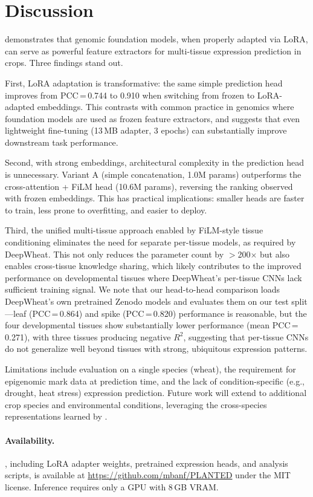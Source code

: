\section{Discussion}\label{sec:discussion}

\mytool demonstrates that genomic foundation models, when properly adapted via LoRA, can serve as powerful feature extractors for multi-tissue expression prediction in crops. Three findings stand out.

First, LoRA adaptation is transformative: the same simple prediction head improves from PCC\,=\,0.744 to 0.910 when switching from frozen to LoRA-adapted embeddings. This contrasts with common practice in genomics where foundation models are used as frozen feature extractors, and suggests that even lightweight fine-tuning (13\,MB adapter, 3 epochs) can substantially improve downstream task performance.

Second, with strong embeddings, architectural complexity in the prediction head is unnecessary. Variant A (simple concatenation, 1.0M params) outperforms the cross-attention + FiLM head (10.6M params), reversing the ranking observed with frozen embeddings. This has practical implications: smaller heads are faster to train, less prone to overfitting, and easier to deploy.

Third, the unified multi-tissue approach enabled by FiLM-style tissue conditioning eliminates the need for separate per-tissue models, as required by DeepWheat. This not only reduces the parameter count by $>$200$\times$ but also enables cross-tissue knowledge sharing, which likely contributes to the improved performance on developmental tissues where DeepWheat's per-tissue CNNs lack sufficient training signal. We note that our head-to-head comparison loads DeepWheat's own pretrained Zenodo models and evaluates them on our test split---leaf (PCC\,=\,0.864) and spike (PCC\,=\,0.820) performance is reasonable, but the four developmental tissues show substantially lower performance (mean PCC\,=\,0.271), with three tissues producing negative $R^2$, suggesting that per-tissue CNNs do not generalize well beyond tissues with strong, ubiquitous expression patterns.

Limitations include evaluation on a single species (wheat), the requirement for epigenomic mark data at prediction time, and the lack of condition-specific (e.g., drought, heat stress) expression prediction. Future work will extend \mytool to additional crop species and environmental conditions, leveraging the cross-species representations learned by \botanic.

\paragraph{Availability.}
\mytool, including LoRA adapter weights, pretrained expression heads, and analysis scripts, is available at \url{https://github.com/mbanf/PLANTED} under the MIT license. Inference requires only a GPU with 8\,GB VRAM.
